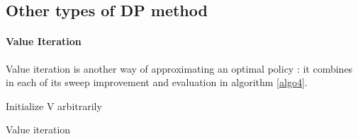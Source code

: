 \documentclass[14pt,a4paper]{article}
\theoremstyle{definition}
\begin{document}
\subsection{Other types of DP method}

\paragraph{Value Iteration}
Value iteration is another way of approximating an optimal policy : it combines in each of its sweep improvement and evaluation in algorithm \ref{algo4}.

\begin{algorithm}[H]
    \label{algo4}
    
	    
    Initialize V arbitrarily 
    

    
\caption{Value iteration}
\end{algorithm}
\end{document}
